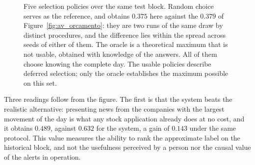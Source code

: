 \begin{figure}[htbp]
\centering
{}
\caption[The system against the alternatives already available]{Five selection policies over the
same test block. Random choice serves as the reference, and obtains $0.375$ here against the $0.379$
of Figure~\ref{fig:av_orcamento}: they are two runs of the same draw by distinct procedures, and the
difference lies within the spread across seeds of either of them. The oracle is a theoretical
maximum that is
not usable, obtained with knowledge of the answers. All of them choose knowing the complete day.
The usable policies describe deferred selection; only the oracle establishes the maximum
possible on this set.}
\label{fig:av_pontaaponta}
\end{figure}

Three readings follow from the figure. The first is that the system beats the realistic
alternative: presenting news from the companies with the largest movement of the day is what any
stock application already does at no cost, and it obtains $0.489$, against $0.632$ for the system,
a gain of $0.143$ under the same protocol. This value measures the ability to rank the approximate
label on the historical block, and not the usefulness perceived by a person nor the causal value of
the alerts in operation.

